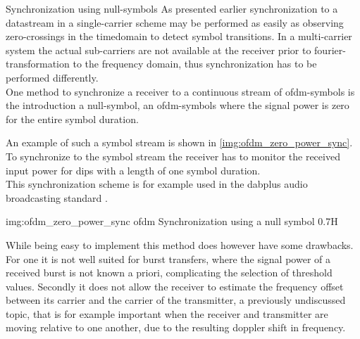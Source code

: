 \begin{subchapter}{Synchronization using null-symbols}
  As presented earlier synchronization to a datastream in a single-carrier scheme
  may be performed as easily as observing zero-crossings in the
  timedomain to detect symbol transitions.
  In a multi-carrier system the actual sub-carriers are not available
  at the receiver prior to fourier-transformation to the
  frequency domain, thus synchronization has to be performed
  differently. \\

  One method to synchronize a receiver to a continuous stream
  of \gls{ofdm}-symbols is the introduction a null-symbol,
  an \gls{ofdm}-symbols where the signal power is zero for the
  entire symbol duration.

  An example of such a symbol stream is shown in
  \autoref{img:ofdm_zero_power_sync}.
  To synchronize to the symbol stream the receiver has
  to monitor the received input power for dips with a
  length of one symbol duration. \\

  This synchronization scheme is for example used in
  the \acrshort{dabplus} audio broadcasting standard \cite{dabstandard}.

               {img:ofdm_zero_power_sync}
               {\acrshort{ofdm} Synchronization using a null symbol}
               {0.7}{H}

  While being easy to implement this method does however
  have some drawbacks.
  For one it is not well suited for burst transfers,
  where the signal power of a received burst is not
  known a priori, complicating the selection of threshold
  values.
  Secondly it does not allow the receiver to estimate the
  frequency offset between its carrier and the carrier of the
  transmitter, a previously undiscussed topic, that is
  for example important when the receiver and transmitter
  are moving relative to one another, due to the resulting doppler
  shift in frequency.               
\end{subchapter}
               
